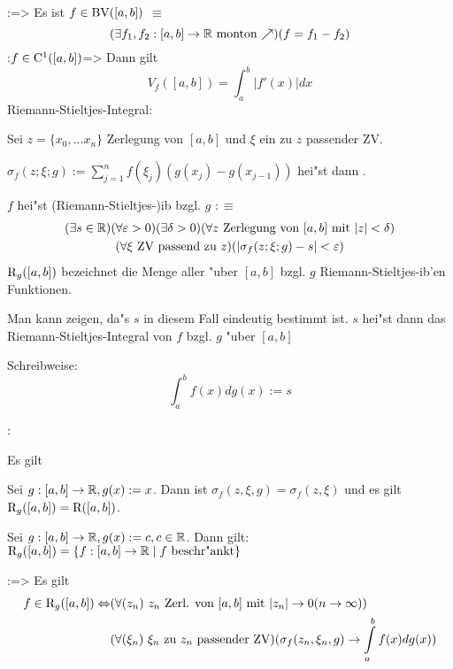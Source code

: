 \theorem:=>{
  Es ist $f\in{\rm BV}([a,b])$ $\equiv$
  \[(\exists f_1,f_2:[a,b]\to\mathbb R \text{ monton $\nearrow$})(f=f_1-f_2)
    \]
  }
\theorem:$f\in{\rm C}^1([a,b])$=>{
  Dann gilt 
  \[V_f([a,b])=\int_a^b |f'(x)| dx
    \]
  }
 Riemann-Stieltjes-Integral:{
  Sei $z=\{x_0,...x_n\}$ Zerlegung von $[a,b]$ und $\xi$ ein zu $z$ 
  passender ZV.
  
  $\sigma_f(z;\xi;g):=\sum_{j=1}^n f(\xi_j)(g(x_j)-g(x_{j-1}))$
  hei"st dann .
  
  $f$ hei"st (Riemann-Stieltjes-)ib bzgl. $g$ $:\equiv$
  \begin{multline*}
    (\exists s\in\mathbb R)(\forall \varepsilon>0)(\exists \delta>0)
    (\forall z \text{ Zerlegung von $[a,b]$ mit $|z|<\delta$})\\
    (\forall \xi \text{ ZV passend zu $z$})(|\sigma_f(z;\xi;g)-s|<\varepsilon)
    \end{multline*}
  ${\rm R}_g([a,b])$ bezeichnet die Menge aller "uber $[a,b]$ bzgl. $g$
  Riemann-Stieltjes-ib'en Funktionen.
  
  Man kann zeigen, da"s $s$ in diesem Fall eindeutig bestimmt ist. $s$
  hei"st dann das Riemann-Stieltjes-Integral von $f$ bzgl. $g$
  "uber $[a,b]$
  
  Schreibweise:
  \[\int_a^b f(x)dg(x):=s
    \]
}
\remark:{
  Es gilt
  \begin{stmts}
    \item Sei $g:[a,b]\to\mathbb R, g(x):=x$. Dann ist 
      $\sigma_f(z,\xi,g)=\sigma_f(z,\xi)$ und es gilt 
      ${\rm R}_g([a,b])={\rm R}([a,b])$.
    \item Sei $g:[a,b]\to\mathbb R, g(x):=c, c\in\mathbb R$. Dann gilt:
      ${\rm R}_g([a,b])=\{f:[a,b]\to\mathbb R\mid f \text{ beschr"ankt}\}$
    \end{stmts}
  }
\theorem:=>{
  Es gilt
  \[\begin{split}
    f\in\SetRInt_g([a,b]) \equiv 
    & (\forall (z_n) \text{ $z_n$ Zerl. von $[a,b]$ mit $|z_n|\to 0 (n\to\infty)$})\\
    & (\forall (\xi_n) \text{ $\xi_n$ zu $z_n$ passender ZV})
      (\sigma_f(z_n,\xi_n,g)\to\int_a^b f(x)dg(x))
    \end{split}\]
  }
